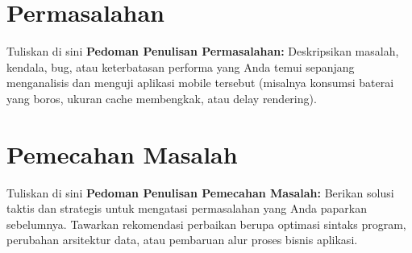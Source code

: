 \section{Permasalahan}


Tuliskan di sini \textbf{Pedoman Penulisan Permasalahan:} Deskripsikan masalah, kendala, bug, atau keterbatasan performa yang Anda temui sepanjang menganalisis dan menguji aplikasi mobile tersebut (misalnya konsumsi baterai yang boros, ukuran cache membengkak, atau delay rendering).


\section{Pemecahan Masalah}


Tuliskan di sini \textbf{Pedoman Penulisan Pemecahan Masalah:} Berikan solusi taktis dan strategis untuk mengatasi permasalahan yang Anda paparkan sebelumnya. Tawarkan rekomendasi perbaikan berupa optimasi sintaks program, perubahan arsitektur data, atau pembaruan alur proses bisnis aplikasi.

